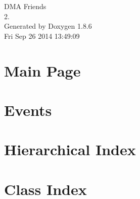 \documentclass[twoside]{book}
\newcommand{\clearemptydoublepage}{%
  \newpage{\pagestyle{empty}\cleardoublepage}%
}
\begin{document}
\hypersetup{pageanchor=false}
\begin{titlepage}
\vspace*{7cm}
\begin{center}%
{\Large D\-M\-A Friends \\[1ex]\large 2. }\\
\vspace*{1cm}
{\large Generated by Doxygen 1.8.6}\\
\vspace*{0.5cm}
{\small Fri Sep 26 2014 13:49:09}\\
\end{center}
\end{titlepage}
\clearemptydoublepage
\tableofcontents
\clearemptydoublepage
{}
\hypersetup{pageanchor=true}

\chapter{Main Page}
\label{index}\hypertarget{index}{}
\chapter{Events}
\label{df/d0e/md_docs_EVENTS}
\hypertarget{df/d0e/md_docs_EVENTS}{}

\chapter{Hierarchical Index}

\chapter{Class Index}

\end{document}
